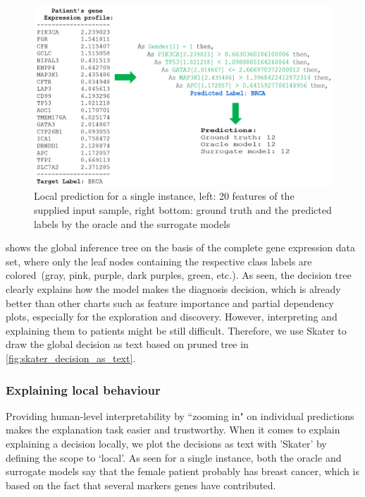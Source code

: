\begin{figure}
	\centering
		\includegraphics[scale=0.9]{images/single_pred_feature.png}
	    \caption[Local prediction for a single instance.]{Local prediction for a single instance, left: 20 features of the supplied input sample, right bottom: ground truth and the predicted labels by the oracle and the surrogate models}
	    \label{fig:decision_as_text_local_1}
\end{figure}

\hspace*{3.5mm}  shows the global inference tree on the basis of the complete gene expression data set, where only the leaf nodes containing the respective class labels are colored~(gray, pink, purple, dark purples, green, etc.). As seen, the decision tree clearly explains how the model makes the diagnosis decision, which is already better than other charts such as feature importance and partial dependency plots, especially for the exploration and discovery. However, interpreting and explaining them to patients might be still difficult. Therefore, we use Skater to draw the global decision as text based on pruned tree in \cref{fig:skater_decision_as_text}. %

\subsubsection{Explaining local behaviour}
Providing human-level interpretability by ``zooming in" on individual predictions makes the explanation task easier and trustworthy\cite{ribeiro2018anchors}. When it comes to explain explaining a decision locally, we plot the decisions as text with 'Skater' by defining the scope to `local'. As seen for a single instance, both the oracle and surrogate models say that the female patient probably has breast cancer, which is based on the fact that several markers genes have contributed. 

